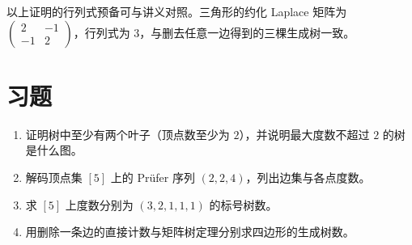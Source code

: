 以上证明的行列式预备可与讲义\cite{matrix-tree-notes}对照。三角形的约化 Laplace 矩阵为 $\begin{pmatrix}2&-1\\-1&2\end{pmatrix}$，行列式为 $3$，与删去任意一边得到的三棵生成树一致。

\section{习题}
\begin{enumerate}
  \item\label{ex:graphs-trees-1} 证明树中至少有两个叶子（顶点数至少为 $2$），并说明最大度数不超过 $2$ 的树是什么图。
  \item\label{ex:graphs-trees-2} 解码顶点集 $[5]$ 上的 Pr\"ufer 序列 $(2,2,4)$，列出边集与各点度数。
  \item\label{ex:graphs-trees-3} 求 $[5]$ 上度数分别为 $(3,2,1,1,1)$ 的标号树数。
  \item\label{ex:graphs-trees-4} 用删除一条边的直接计数与矩阵树定理分别求四边形的生成树数。
\end{enumerate}

